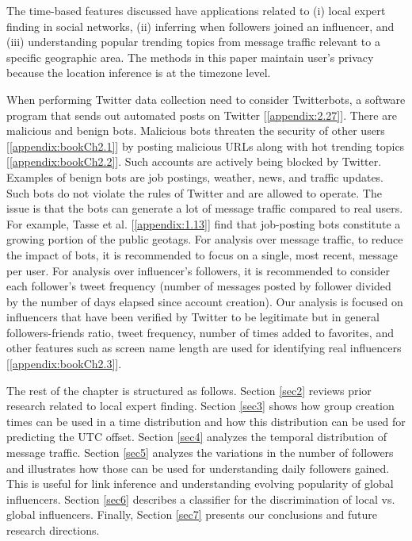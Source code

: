  The time-based features discussed have applications related to (i) local expert finding in social networks, (ii) inferring when followers joined an influencer, and (iii) understanding popular trending topics from message traffic relevant to a specific geographic area. The methods in this paper maintain user's privacy because the location inference is at the timezone level. 
 
When performing Twitter data collection need to consider Twitterbots, a software program that sends out automated posts on Twitter [\ref{appendix:2.27}]. There are malicious and benign bots. Malicious bots threaten the security of other users [\ref{appendix:bookCh2.1}] by posting malicious URLs along with hot trending topics [\ref{appendix:bookCh2.2}]. Such accounts are actively being blocked by Twitter. Examples of benign bots are job postings, weather, news, and traffic updates. Such bots do not violate the rules of Twitter and are allowed to operate. The issue is that the bots can generate a lot of message traffic compared to real users. For example, Tasse et al. [\ref{appendix:1.13}] find that job-posting bots constitute a growing portion of the public geotags. For analysis over message traffic, to reduce the impact of bots, it is recommended to focus on a single, most recent, message per user. For analysis over influencer’s followers, it is recommended to consider each follower's tweet frequency (number of messages posted by follower divided by the number of days elapsed since account creation). Our analysis is focused on influencers that have been verified by Twitter to be legitimate but in general followers-friends ratio, tweet frequency, number of times added to favorites, and other features such as screen name length are used for identifying real influencers [\ref{appendix:bookCh2.3}].

The rest of the chapter is structured as follows. Section \ref{sec2} reviews prior research related to local expert finding. Section \ref{sec3} shows how group creation times can be used in a time distribution and how this distribution can be used for predicting the UTC offset. Section \ref{sec4} analyzes the 
temporal distribution of message traffic.
Section \ref{sec5} analyzes the variations in the number of followers and illustrates how those can be used for understanding daily followers gained. This is useful for link inference and understanding evolving popularity of global influencers. Section \ref{sec6} describes a classifier for the discrimination of local vs. global influencers. Finally, Section \ref{sec7} presents our conclusions and future research directions.

